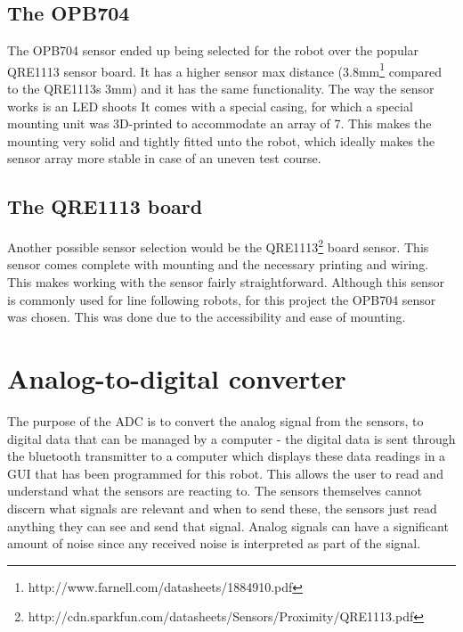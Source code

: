 \subsection{The OPB704}
The OPB704 sensor ended up being selected for the robot over the popular QRE1113 sensor board. It has a higher sensor max distance (3.8mm\footnote{http://www.farnell.com/datasheets/1884910.pdf} compared to the QRE1113s 3mm) and it has the same functionality. The way the sensor works is an LED shoots It comes with a special casing, for which a special mounting unit was 3D-printed to accommodate an array of 7. This makes the mounting very solid and tightly fitted unto the robot, which ideally makes the sensor array more stable in case of an uneven test course.

\subsection{The QRE1113 board}
Another possible sensor selection would be the QRE1113\footnote{http://cdn.sparkfun.com/datasheets/Sensors/Proximity/QRE1113.pdf} board sensor. This sensor comes complete with mounting and the necessary printing and wiring. This makes working with the sensor fairly straightforward. Although this sensor is commonly used for line following robots, for this project the OPB704 sensor was chosen. This was done due to the accessibility and ease of mounting.


\section{Analog-to-digital converter}
The purpose of the ADC is to convert the analog signal from the sensors, to digital data that can be managed by a computer - the digital data is sent through the bluetooth transmitter to a computer which displays these data readings in a GUI that has been programmed for this robot. This allows the user to read and understand what the sensors are reacting to. The sensors themselves cannot discern what signals are relevant and when to send these, the sensors just read anything they can see and send that signal. Analog signals can have a significant amount of noise since any received noise is interpreted as part of the signal.

